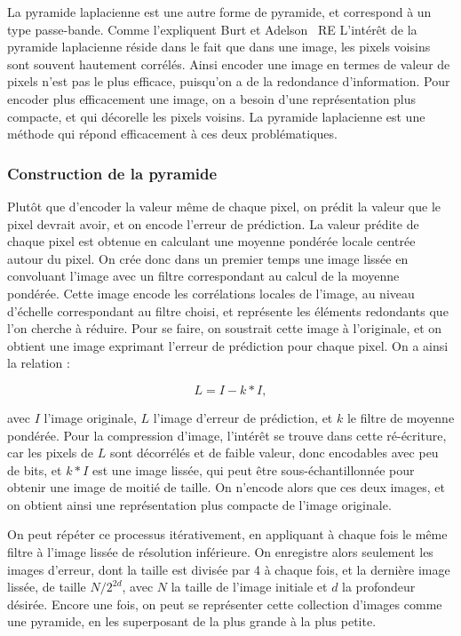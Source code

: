 La pyramide laplacienne est une autre forme de pyramide, et correspond à un type passe-bande. Comme l'expliquent Burt et Adelson~\cite{burt_laplacian_1983} RE L'intérêt de la pyramide laplacienne réside dans le fait que dans une image, les pixels voisins sont souvent hautement corrélés. Ainsi encoder une image en termes de valeur de pixels n'est pas le plus efficace, puisqu'on a de la redondance d'information. Pour encoder plus efficacement une image, on a besoin d'une représentation plus compacte, et qui décorelle les pixels voisins. La pyramide laplacienne est une méthode qui répond efficacement à ces deux problématiques.

\subsubsection{Construction de la pyramide}

Plutôt que d'encoder la valeur même de chaque pixel, on prédit la valeur que le pixel devrait avoir, et on encode l'erreur de prédiction. La valeur prédite de chaque pixel est obtenue en calculant une moyenne pondérée locale centrée autour du pixel. On crée donc dans un premier temps une image lissée en convoluant l'image avec un filtre correspondant au calcul de la moyenne pondérée. Cette image encode les corrélations locales de l'image, au niveau d'échelle correspondant au filtre choisi, et représente les éléments redondants que l'on cherche à réduire. Pour se faire, on soustrait cette image à l'originale, et on obtient une image exprimant l'erreur de prédiction pour chaque pixel. On a ainsi la relation :

\begin{equation}
    L = I - k * I,
\end{equation}

avec $I$ l'image originale, $L$ l'image d'erreur de prédiction, et $k$ le filtre de moyenne pondérée. Pour la compression d'image, l'intérêt se trouve dans cette ré-écriture, car les pixels de $L$ sont décorrélés et de faible valeur, donc encodables avec peu de bits, et $k*I$ est une image lissée, qui peut être sous-échantillonnée pour obtenir une image de moitié de taille. On n'encode alors que ces deux images, et on obtient ainsi une représentation plus compacte de l'image originale.

On peut répéter ce processus itérativement, en appliquant à chaque fois le même filtre à l'image lissée de résolution inférieure. On enregistre alors seulement les images d'erreur, dont la taille est divisée par 4 à chaque fois, et la dernière image lissée, de taille $N/2^{2d}$, avec $N$ la taille de l'image initiale et $d$ la profondeur désirée. Encore une fois, on peut se représenter cette collection d'images comme une pyramide, en les superposant de la plus grande à la plus petite.

